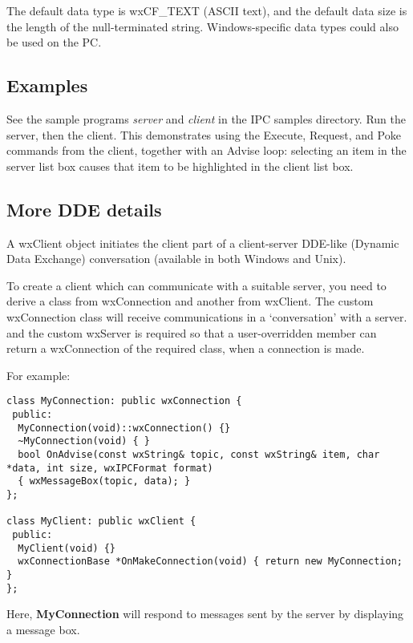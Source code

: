The default data type is wxCF\_TEXT (ASCII text), and the default data
size is the length of the null-terminated string. Windows-specific data
types could also be used on the PC.

\subsection{Examples}\label{ipcexamples}

See the sample programs {\it server}\/ and {\it client}\/ in the IPC
samples directory.  Run the server, then the client. This demonstrates
using the Execute, Request, and Poke commands from the client, together
with an Advise loop: selecting an item in the server list box causes
that item to be highlighted in the client list box.

\subsection{More DDE details}\label{ddedetails}

A wxClient object initiates the client part of a client-server
DDE-like (Dynamic Data Exchange) conversation (available in both
Windows and Unix).

To create a client which can communicate with a suitable server,
you need to derive a class from wxConnection and another from
wxClient. The custom wxConnection class will receive
communications in a `conversation' with a server.  and the custom
wxServer is required so that a user-overridden
member can return a wxConnection of the required class, when a
connection is made.

For example:

\begin{verbatim}
class MyConnection: public wxConnection {
 public:
  MyConnection(void)::wxConnection() {}
  ~MyConnection(void) { }
  bool OnAdvise(const wxString& topic, const wxString& item, char *data, int size, wxIPCFormat format)
  { wxMessageBox(topic, data); }
};

class MyClient: public wxClient {
 public:
  MyClient(void) {}
  wxConnectionBase *OnMakeConnection(void) { return new MyConnection; }
};

\end{verbatim}

Here, {\bf MyConnection} will respond to
 messages sent by the
server by displaying a message box.

